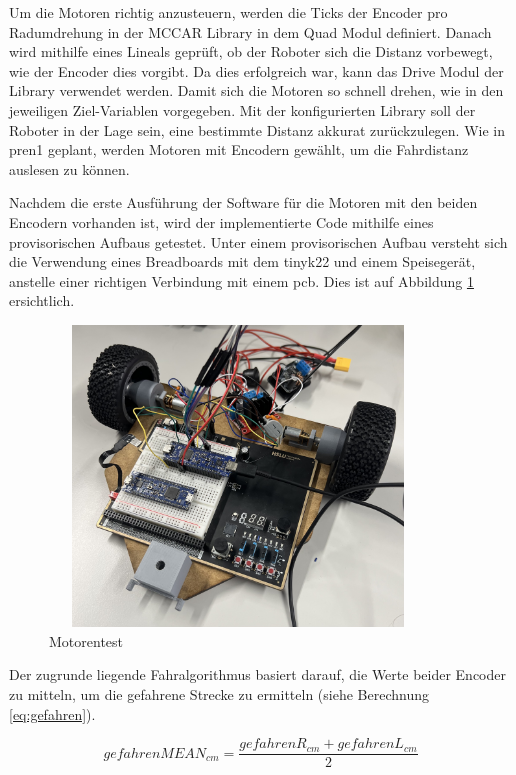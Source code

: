 Um die Motoren richtig anzusteuern, werden die Ticks der Encoder pro Radumdrehung in der MCCAR Library in dem Quad Modul definiert. Danach wird mithilfe eines Lineals geprüft, ob der Roboter sich die Distanz vorbewegt, wie der Encoder dies vorgibt. Da dies erfolgreich war, kann das Drive Modul der Library verwendet werden. Damit sich die Motoren so schnell drehen, wie in den jeweiligen Ziel-Variablen vorgegeben. Mit der konfigurierten Library soll der Roboter in der Lage sein, eine bestimmte Distanz akkurat zurückzulegen. Wie in \acrshort{pren1} geplant, werden Motoren mit Encodern gewählt, um die Fahrdistanz auslesen zu können.

Nachdem die erste Ausführung der Software für die Motoren mit den beiden Encodern vorhanden ist, wird der implementierte Code mithilfe eines provisorischen Aufbaus getestet. Unter einem provisorischen Aufbau versteht sich die Verwendung eines Breadboards mit dem \gls{tinyk22} und einem Speisegerät, anstelle einer richtigen Verbindung mit einem \acrshort{pcb}. Dies ist auf Abbildung \ref{fig: Motorentest} ersichtlich.

\begin{figure}[H]
\centering
\includegraphics[width=10cm, height=8cm]{assets/ET/Motoren/Motorentest.jpeg}
\caption{Motorentest}
\label{fig: Motorentest}
\end{figure}

Der zugrunde liegende Fahralgorithmus basiert darauf, die Werte beider Encoder zu mitteln, um die gefahrene Strecke zu ermitteln (siehe Berechnung \ref{eq:gefahren}).

\begin{equation}
    gefahrenMEAN_{cm} = \frac{gefahrenR_{cm} + gefahrenL_{cm}} {2} 
    \label{eq:gefahren}
\end{equation}








